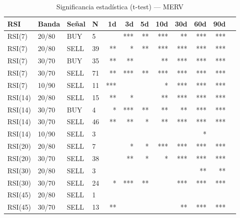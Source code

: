 %
\begin{table}[htbp]
    \centering
    \caption{Significancia estadística (t-test) --- MERV}
    \label{tab:sig_merv}
    \small
    \begin{tabular}{llllrrrrrrrr}
        \toprule
        \textbf{RSI} & \textbf{Banda} & \textbf{Se\~{n}al} & \textbf{N} & \textbf{1d} & \textbf{3d} & \textbf{5d} & \textbf{10d} & \textbf{30d} & \textbf{60d} & \textbf{90d} \\
        \midrule
        RSI(7) & 20/80 & BUY & 5 &  & *** & ** & *** & ** & *** & *** \\
        RSI(7) & 20/80 & SELL & 39 & ** & * & ** & *** & *** & *** & *** \\
        RSI(7) & 30/70 & BUY & 35 & ** & ** &  & ** & *** & *** & *** \\
        RSI(7) & 30/70 & SELL & 71 & ** & *** & ** & *** & *** & *** & *** \\
        RSI(7) & 10/90 & SELL & 11 & *** &  &  & * & *** & *** & *** \\
        \midrule
        RSI(14) & 20/80 & SELL & 15 & ** & * &  & ** & *** & *** & *** \\
        RSI(14) & 30/70 & BUY & 4 & * & *** & ** & ** & ** & *** & *** \\
        RSI(14) & 30/70 & SELL & 46 & ** & ** & * & ** & *** & *** & *** \\
        RSI(14) & 10/90 & SELL & 3 &  &  &  &  &  & * &  \\
        \midrule
        RSI(20) & 20/80 & SELL & 7 &  & * & * & *** & *** & *** & *** \\
        RSI(20) & 30/70 & SELL & 38 &  & ** & * & * & *** & *** & *** \\
        \midrule
        RSI(30) & 20/80 & SELL & 3 &  &  &  &  &  & ** & ** \\
        RSI(30) & 30/70 & SELL & 24 & * & *** & ** &  & *** & *** & *** \\
        \midrule
        RSI(45) & 20/80 & SELL & 1 &  &  &  &  &  &  &  \\
        RSI(45) & 30/70 & SELL & 13 & ** &  &  &  & ** & *** & *** \\
        \bottomrule
    \end{tabular}
\end{table}

